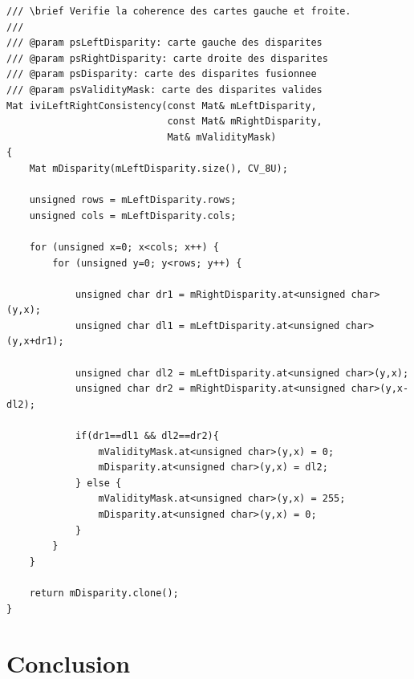 \documentclass[a4paper,11pt]{article}
\begin{document}
\begin{lstlisting}[caption=Fonction donnant la disparité cohérente gauche-droite]
/// \brief Verifie la coherence des cartes gauche et froite.
///
/// @param psLeftDisparity: carte gauche des disparites
/// @param psRightDisparity: carte droite des disparites
/// @param psDisparity: carte des disparites fusionnee
/// @param psValidityMask: carte des disparites valides
Mat iviLeftRightConsistency(const Mat& mLeftDisparity,
                            const Mat& mRightDisparity,
                            Mat& mValidityMask)
{
    Mat mDisparity(mLeftDisparity.size(), CV_8U);

    unsigned rows = mLeftDisparity.rows;
    unsigned cols = mLeftDisparity.cols;

    for (unsigned x=0; x<cols; x++) {
        for (unsigned y=0; y<rows; y++) {

            unsigned char dr1 = mRightDisparity.at<unsigned char>(y,x);
            unsigned char dl1 = mLeftDisparity.at<unsigned char>(y,x+dr1);

            unsigned char dl2 = mLeftDisparity.at<unsigned char>(y,x);
            unsigned char dr2 = mRightDisparity.at<unsigned char>(y,x-dl2);

            if(dr1==dl1 && dl2==dr2){
                mValidityMask.at<unsigned char>(y,x) = 0;
                mDisparity.at<unsigned char>(y,x) = dl2;
            } else {
                mValidityMask.at<unsigned char>(y,x) = 255;
                mDisparity.at<unsigned char>(y,x) = 0;
            }
        }
    }

    return mDisparity.clone();
}
\end{lstlisting}

\section{Conclusion}
\end{document}
